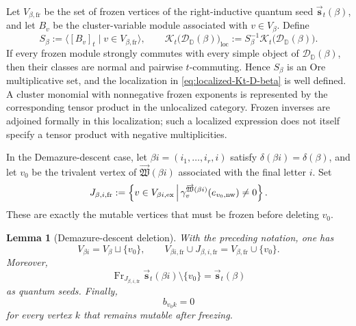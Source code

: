 \documentclass[12pt, reqno]{amsart}
\theoremstyle{plain}
\newtheorem{lemma}[theorem]{Lemma}
\theoremstyle{definition}
\numberwithin{equation}{section}
\newcommand{\DD}{\mathbb{D}}
\begin{document}
Let \(V_{\beta,\mathrm{fr}}\) be the set of frozen vertices of the
right-inductive quantum seed
\(\overrightarrow{\mathbf s}_t(\beta)\), and let \(B_v\) be the
cluster-variable module associated with \(v\in V_\beta\). Define
\begin{equation}\label{eq:localized-Kt-D-beta}
    S_\beta
    :=
    \bigl\langle
        [B_v]_t
        \mid v\in V_{\beta,\mathrm{fr}}
    \bigr\rangle,
    \qquad
    \mathcal{K}_t\bigl(\mathscr D_{\DD}(\beta)\bigr)_{\mathrm{loc}}
    :=
    S_\beta^{-1}
    \mathcal{K}_t\bigl(\mathscr D_{\DD}(\beta)\bigr).
\end{equation}
If every frozen module strongly commutes with every simple object of
\(\mathscr D_{\DD}(\beta)\), then their classes are normal and
pairwise \(t\)-commuting. Hence \(S_\beta\) is an Ore multiplicative
set, and the localization in \eqref{eq:localized-Kt-D-beta} is well
defined.
A cluster monomial with nonnegative frozen exponents is represented
by the corresponding tensor product in the unlocalized category.
Frozen inverses are adjoined formally in this localization; such a
localized expression does not itself specify a tensor product with
negative multiplicities.

In the Demazure-descent case, let
\(\beta i=(i_1,\ldots,i_r,i)\) satisfy
\(\delta(\beta i)=\delta(\beta)\), and let \(v_0\) be the trivalent
vertex of \(\overrightarrow{\mathfrak W}(\beta i)\) associated with
the final letter \(i\). Set
\begin{equation}\label{eq:J-beta-i-fr-definition}
    J_{\beta,i,\mathrm{fr}}
    :=
    \left\{
        v\in V_{\beta i,\rm ex}
        \,\middle|\,
        \gamma_v^{\overrightarrow{\mathfrak W}(\beta i)}
        (e_{v_0,\mathrm{nw}})
        \neq 0
    \right\}.
\end{equation}
These are exactly the mutable vertices that must be frozen before
deleting \(v_0\).

\begin{lemma}[Demazure-descent deletion]
\label{lem:Demazure-descent-seed-deletion}
With the preceding notation, one has
\begin{equation}\label{eq:Demazure-descent-frozen-set}
    V_{\beta i}=V_\beta\sqcup\{v_0\},
    \qquad
    V_{\beta i,\mathrm{fr}}\cup J_{\beta,i,\mathrm{fr}}
    =
    V_{\beta,\mathrm{fr}}\cup\{v_0\}.
\end{equation}
Moreover,
\begin{equation}\label{eq:Demazure-descent-seed-deletion}
    \operatorname{Fr}_{J_{\beta,i,\mathrm{fr}}}
    \overrightarrow{\mathbf s}_t(\beta i)
    \setminus\{v_0\}
    =
    \overrightarrow{\mathbf s}_t(\beta)
\end{equation}
as quantum seeds. Finally,
\begin{equation}\label{eq:Demazure-descent-zero-row}
    b_{v_0k}=0
\end{equation}
for every vertex \(k\) that remains mutable after freezing.
\end{lemma}
\end{document}
